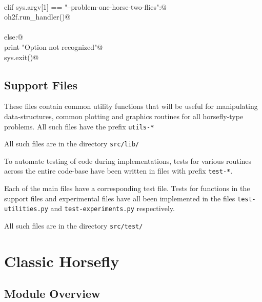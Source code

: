 \documentclass[12pt]{report}
\begin{document}
\begin{flushleft}
\begin{minipage}{\linewidth}
\begin{list}{}{}
\mbox{}\verb@@\\
\mbox{}\verb@     elif sys.argv[1] == "--problem-one-horse-two-flies":@\\
\mbox{}\verb@          oh2f.run_handler()@\\
\mbox{}\verb@@\\
\mbox{}\verb@     else:@\\
\mbox{}\verb@          print "Option not recognized"@\\
\mbox{}\verb@          sys.exit()@\\
\mbox{}\verb@@{\NWsep}
\end{list}
\vspace{-1.5ex}
\footnotesize
\begin{list}{}{\setlength{\itemsep}{-\parsep}\setlength{\itemindent}{-\leftmargin}}

\item{}
\end{list}
\end{minipage}\vspace{4ex}
\end{flushleft}
\section{Support Files}
\newchunk These files contain common utility functions that will be useful for manipulating
 data-structures, common plotting and graphics routines for all horsefly-type 
 problems. All such files have the prefix \texttt{utils-*}

 All such files are in the directory \texttt{src/lib/}

\newchunk To automate testing of code during implementations, tests for various 
 routines across the entire code-base have been written in files with prefix
 \texttt{test-*}.  

 Each of the main files have a corresponding test file. Tests for functions in the 
 support files and experimental files have all been implemented in the files 
 \texttt{test-utilities.py} and \texttt{test-experiments.py} respectively.  
       
 All such files are in the directory \texttt{src/test/}
 \chapter{Classic Horsefly}
\label{chap:classic-horsefly}


\section{Module Overview}
\end{document}
